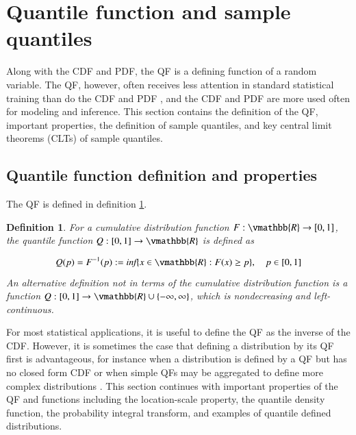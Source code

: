 \documentclass[preprint,12pt,authoryear]{elsarticle}
\newtheorem{definition}{Definition}
\begin{document}
\section{Quantile function and sample quantiles} \label{sec:quant_func}


Along with the CDF and PDF, the QF is a defining function of a random variable. The QF, however, often receives less attention in standard statistical training than do the CDF and PDF \cite[]{parzen2004quantile}, and the CDF and PDF are more used often for modeling and inference.
This section contains the definition of the QF, important properties, the definition of sample quantiles, and key central limit theorems (CLTs) of sample quantiles. 

\subsection{Quantile function definition and properties}

The QF is defined in definition \ref{def:qf}.


\begin{definition}
    \label{def:qf}
    For a cumulative distribution function $F: \vmathbb{R} \rightarrow [0,1]$, the quantile function $Q: [0,1] \rightarrow \vmathbb{R}$ is defined as 
    
    \begin{equation*}
    \label{eq:qf}
        Q(p) = F^{-1}(p) := \emph{inf}\{x \in \vmathbb{R} : F(x) \geq p\}, \quad p \in [0,1]
    \end{equation*}
    An alternative definition not in terms of the cumulative distribution function is a function $Q: [0,1] \rightarrow \vmathbb{R} \cup \{-\infty, \infty\}$, which is nondecreasing and left-continuous. 
\end{definition}

For most statistical applications, it is useful to define the QF as the inverse of the CDF. However, it is sometimes the case that defining a distribution by its QF first is advantageous, for instance when a distribution is defined by a QF but has no closed form CDF or when simple QFs may be aggregated to define more complex distributions \cite[]{perepolkin2023tenets, gasthaus2019probabilistic, alvarez2023quantile}. This section continues with important properties of the QF and functions including the location-scale property, the quantile density function, the probability integral transform, and examples of quantile defined distributions.
\end{document}
